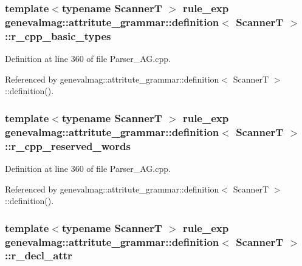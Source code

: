 \hypertarget{structgenevalmag_1_1attritute__grammar_1_1definition_a0cdc120e07aa93de5d9ee66e8489ead8}{
\subsubsection[{r\_\-cpp\_\-basic\_\-types}]{\setlength{\rightskip}{0pt plus 5cm}template$<$typename ScannerT $>$ {\bf rule\_\-exp} {\bf genevalmag::attritute\_\-grammar::definition}$<$ ScannerT $>$::{\bf r\_\-cpp\_\-basic\_\-types}}}
\label{structgenevalmag_1_1attritute__grammar_1_1definition_a0cdc120e07aa93de5d9ee66e8489ead8}


Definition at line 360 of file Parser\_\-AG.cpp.



Referenced by genevalmag::attritute\_\-grammar::definition$<$ ScannerT $>$::definition().

\hypertarget{structgenevalmag_1_1attritute__grammar_1_1definition_a58133c902b276c3fc7795a0e868f26f9}{
\subsubsection[{r\_\-cpp\_\-reserved\_\-words}]{\setlength{\rightskip}{0pt plus 5cm}template$<$typename ScannerT $>$ {\bf rule\_\-exp} {\bf genevalmag::attritute\_\-grammar::definition}$<$ ScannerT $>$::{\bf r\_\-cpp\_\-reserved\_\-words}}}
\label{structgenevalmag_1_1attritute__grammar_1_1definition_a58133c902b276c3fc7795a0e868f26f9}


Definition at line 360 of file Parser\_\-AG.cpp.



Referenced by genevalmag::attritute\_\-grammar::definition$<$ ScannerT $>$::definition().

\hypertarget{structgenevalmag_1_1attritute__grammar_1_1definition_a255e9a3002dc4e6da571b57c6bacc62a}{
\subsubsection[{r\_\-decl\_\-attr}]{\setlength{\rightskip}{0pt plus 5cm}template$<$typename ScannerT $>$ {\bf rule\_\-exp} {\bf genevalmag::attritute\_\-grammar::definition}$<$ ScannerT $>$::{\bf r\_\-decl\_\-attr}}}
\label{structgenevalmag_1_1attritute__grammar_1_1definition_a255e9a3002dc4e6da571b57c6bacc62a}


